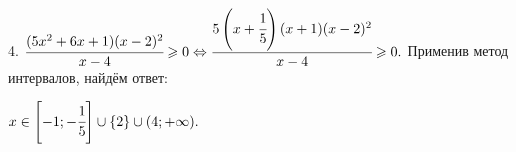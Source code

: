 4. $\cfrac{(5x^2+6x+1)(x-2)^2}{x-4}\geqslant0\Leftrightarrow\cfrac{5\left(x+\cfrac{1}{5}\right)(x+1)(x-2)^2}{x-4}\geqslant0.$ Применив метод интервалов, найдём ответ:
\begin{figure}[ht!]
\end{figure}
$x\in\left[-1;-\cfrac{1}{5}\right]\cup\{2\}\cup(4;+\infty).$\newpage\noindent
